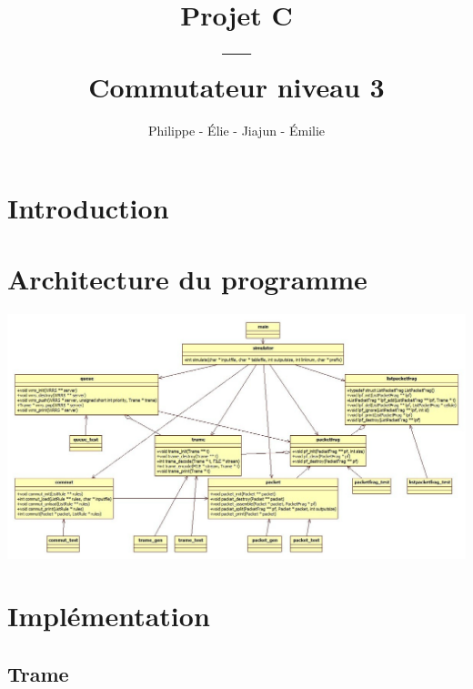\documentclass{beamer}
\title{Projet C\\---\\Commutateur niveau 3}
\author{Philippe \bsc{Tran Ba} - Élie \bsc{Bouttier} - Jiajun \bsc{Shi} - Émilie \bsc{Abia}}
\institute{ENSEEIHT, département TR}
\newenvironment{changemargin}[2]{%
 \begin{list}{}{%
 \setlength{\topsep}{0pt}%
 \setlength{\leftmargin}{#1}%
 \setlength{\rightmargin}{#2}%
 \setlength{\listparindent}{\parindent}%
 \setlength{\itemindent}{\parindent}%
 \setlength{\parsep}{\parskip}%
 }%
 \item[]}{\end{list}}
\begin{document}
\begin{frame}
\titlepage
\end{frame}

\begin{frame}
\tableofcontents
\end{frame}

\section{Introduction}

\section{Architecture du programme}

\begin{frame}[plain]
    \begin{changemargin}{-1cm}{-1cm}
        \begin{center}
            \includegraphics[width=\paperwidth,height=\paperheight,keepaspectratio]{UML2.jpg}
        \end{center}
    \end{changemargin}
\end{frame}


\section{Implémentation}

\subsection{Trame}
\end{document}
